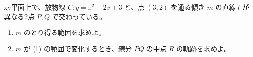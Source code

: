 \documentclass[8pt,dvipdfmx]{article}[b5paper]
\begin{document}
\begin{tcolorbox}[title=数学\textcircled{1} 5-4 ABC]
xy平面上で、放物線 $C: y = x^2 - 2x + 3$ と、点 $(3, 2)$ を通る傾き $m$ の直線 $l$ が異なる2点 $P, Q$ で交わっている。
\begin{enumerate}[(1)]
\item $m$ のとり得る範囲を求めよ。
    \item $m$ が (1) の範囲で変化するとき、線分 $PQ$ の中点 $R$ の軌跡を求めよ。
\end{enumerate}
\end{tcolorbox}
\end{document}
